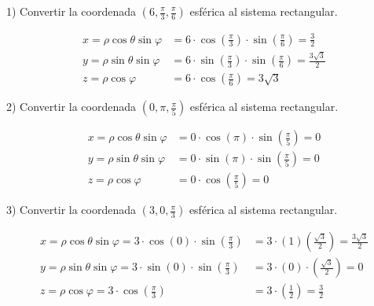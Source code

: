 1) Convertir la coordenada ${\left(6,\frac{\pi}{3},\frac{\pi}{6}\right)}$ esférica al sistema rectangular.

\begin{equation*}
  \begin{split}
    x = \rho \cos \theta \sin \varphi &= 6 \cdot \cos \left(\frac{\pi}{3}\right) \cdot \sin \left( \frac{\pi}{6} \right) = \frac{3}{2}\\
    y = \rho \sin \theta \sin \varphi &= 6 \cdot \sin \left( \frac{\pi}{3} \right) \cdot \sin \left(\frac{\pi}{6} \right) =\frac{3\sqrt{3}}{2}\\
    z = \rho \cos \varphi &= 6 \cdot \cos \left(\frac{\pi}{6} \right) = 3 \sqrt{3}
  \end{split}
\end{equation*}

\vspace{4mm}
2) Convertir la coordenada ${\left(0, \pi , \frac{\pi}{5}\right)}$ esférica al sistema rectangular.

\begin{equation*}
  \begin{split}
    x = \rho \cos \theta \sin \varphi &= 0 \cdot \cos \left(\pi\right) \cdot \sin \left(\frac{\pi}{5}\right) = 0\\
    y = \rho \sin \theta \sin \varphi &= 0 \cdot \sin \left(\pi \right) \cdot \sin \left(\frac{\pi}{5} \right) = 0\\
    z = \rho \cos \varphi &= 0 \cdot \cos \left(\frac{\pi}{5} \right) = 0
  \end{split}
\end{equation*}

\vspace{4mm}
3) Convertir la coordenada ${\left(3,0,\frac{\pi}{3} \right)}$ esférica al sistema rectangular.

\begin{equation*}
  \begin{split}
    x = \rho \cos \theta \sin \varphi = 3 \cdot \cos\left(0\right) \cdot \sin \left(\frac{\pi}{3}\right) &= 3 \cdot \left(1\right) \left(\frac{\sqrt{3}}{2} \right) = \frac{3\sqrt{3}}{2}\\
    y = \rho \sin \theta \sin \varphi = 3 \cdot \sin\left(0\right) \cdot \sin \left( \frac{\pi}{3} \right) &= 3 \cdot \left(0\right) \cdot \left(\frac{\sqrt{3}}{2}\right) = 0\\
    z = \rho \cos \varphi = 3 \cdot \cos \left( \frac{\pi}{3}\right) &= 3 \cdot \left(\frac{1}{2}\right) =\frac{3}{2}
  \end{split}
\end{equation*}

